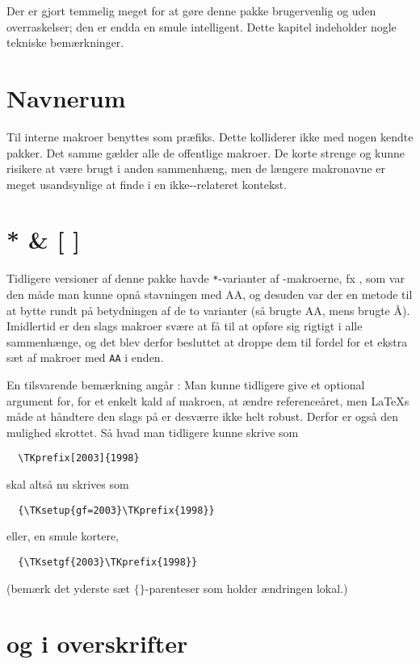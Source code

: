 \documentclass[a4paper,article,oneside,danish]{memoir}
\begin{document}
Der er gjort temmelig meget for at gøre denne pakke brugervenlig og
uden overraskelser; den er endda en smule intelligent. Dette kapitel
indeholder nogle tekniske bemærkninger.

\section{Navnerum}
\label{sec:navnerum}

Til interne makroer benyttes  som præfiks. Dette kolliderer
ikke med nogen kendte pakker. Det samme gælder alle de offentlige
makroer.  De korte strenge  og  kunne risikere at være
brugt i anden sammenhæng, men de længere makronavne er meget
usandsynlige at finde i en ikke-\TK-relateret kontekst.

\section{* \& [ ]}
\label{sec:-og-}

Tidligere versioner af denne pakke havde \texttt{*}-varianter af
-makroerne, fx , som var den måde man kunne opnå
stavningen med AA, og desuden var der en metode til at bytte rundt på
betydningen af de to varianter (så  brugte AA, mens
 brugte Å). Imidlertid er den slags makroer svære at få til
at opføre sig rigtigt i alle sammenhænge, og det blev derfor besluttet
at droppe dem til fordel for et ekstra sæt af makroer med \texttt{AA}
i enden.

En tilsvarende bemærkning angår : Man kunne tidligere
give et optional argument for, for et enkelt kald af makroen, at ændre
referenceåret, men \LaTeX s måde at håndtere den slags på er desværre
ikke helt robust. Derfor er også den mulighed skrottet. Så hvad man
tidligere kunne skrive som
\begin{verbatim}
  \TKprefix[2003]{1998}
\end{verbatim}
skal altså nu skrives som
\begin{verbatim}
  {\TKsetup{gf=2003}\TKprefix{1998}}
\end{verbatim}
eller, en smule kortere,
\begin{verbatim}
  {\TKsetgf{2003}\TKprefix{1998}}
\end{verbatim}
\fboxsep=0pt
(bemærk det yderste sæt $\{\}$-parenteser som holder ændringen lokal.)

\section{\TKETpdf og \ikonCERMpdf i overskrifter}
\label{sec:tket-i-overskrifter}
\end{document}
